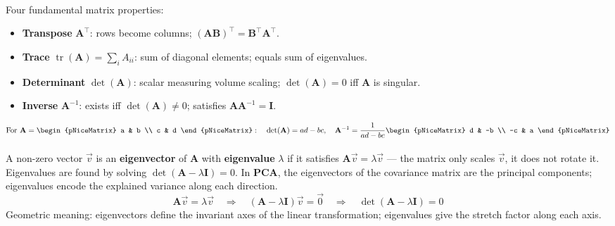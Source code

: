 \begin{tcbitemize}[ skin=sectionraster ]
        \tcbitem[title={Transpose, Trace, Determinant, Inverse}, raster multicolumn=6]
        Four fundamental matrix properties\textsuperscript{\cite{cherneyLinearAlgebra2013}}:
        \begin{itemize}
            \item \textbf{Transpose} $\mathbf{A}^\top$: rows become columns; $(\mathbf{AB})^\top = \mathbf{B}^\top\mathbf{A}^\top$.
            \item \textbf{Trace} $\operatorname{tr}(\mathbf{A}) = \sum_i A_{ii}$: sum of diagonal elements; equals sum of eigenvalues.
            \item \textbf{Determinant} $\det(\mathbf{A})$: scalar measuring volume scaling; $\det(\mathbf{A}) = 0$ iff $\mathbf{A}$ is singular.
            \item \textbf{Inverse} $\mathbf{A}^{-1}$: exists iff $\det(\mathbf{A}) \neq 0$; satisfies $\mathbf{A}\mathbf{A}^{-1} = \mathbf{I}$.
        \end{itemize}
        \tcblower
        \begin{equation}
            \text{For } \mathbf{A} = \begin{pNiceMatrix} a & b \\ c & d \end{pNiceMatrix}:
            \quad \det(\mathbf{A}) = ad - bc, \quad
            \mathbf{A}^{-1} = \frac{1}{ad-bc}\begin{pNiceMatrix} d & -b \\ -c & a \end{pNiceMatrix}
        \end{equation}

        \tcbitem[title={Eigenvalues and Eigenvectors}, raster multicolumn=6]
        A non-zero vector $\vec{v}$ is an \textbf{eigenvector} of $\mathbf{A}$ with \textbf{eigenvalue} $\lambda$ if it satisfies $\mathbf{A}\vec{v} = \lambda\vec{v}$ — the matrix only scales $\vec{v}$, it does not rotate it\textsuperscript{\cite{cherneyLinearAlgebra2013}}. Eigenvalues are found by solving $\det(\mathbf{A} - \lambda\mathbf{I}) = 0$. In \textbf{PCA}, the eigenvectors of the covariance matrix are the principal components; eigenvalues encode the explained variance along each direction.
        \tcblower
        \begin{equation}
            \mathbf{A}\vec{v} = \lambda\vec{v}
            \quad \Longrightarrow \quad
            (\mathbf{A} - \lambda\mathbf{I})\vec{v} = \vec{0}
            \quad \Longrightarrow \quad
            \det(\mathbf{A} - \lambda\mathbf{I}) = 0
        \end{equation}
        Geometric meaning: eigenvectors define the invariant axes of the linear transformation; eigenvalues give the stretch factor along each axis.

    \end{tcbitemize}

